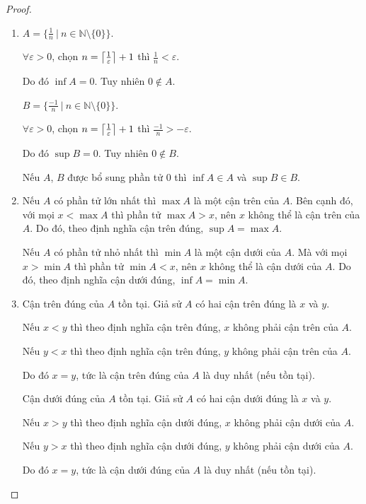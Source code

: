 \documentclass[class=analysis,crop=false]{standalone}
\begin{document}
\begin{proof}
    \begin{enumerate}[label = (\roman*)]
        \item $A = \{ \frac{1}{n}\ |\ n\in\mathbb{N}\setminus\{ 0 \} \}$.
            \par $\forall\varepsilon > 0$, chọn $n = \left\lceil{\frac{1}{\varepsilon}}\right\rceil + 1$ thì $\frac{1}{n} < \varepsilon$.
            \par Do đó $\inf A = 0$. Tuy nhiên $0\not\in A$.
            \par $B = \{ \frac{-1}{n}\ |\ n\in\mathbb{N}\setminus\{ 0 \} \}$.
            \par $\forall\varepsilon > 0$, chọn $n = \left\lceil{\frac{1}{\varepsilon}}\right\rceil + 1$ thì $\frac{-1}{n} > -\varepsilon$.
            \par Do đó $\sup B = 0$. Tuy nhiên $0\not\in B$.
            \par Nếu $A$, $B$ được bổ sung phần tử $0$ thì $\inf A\in A$ và $\sup B\in B$.
        \item Nếu $A$ có phần tử lớn nhất thì $\max A$ là một cận trên của $A$. Bên cạnh đó, với mọi $x < \max A$ thì phần tử $\max A > x$, nên $x$ không thể là cận trên của $A$. Do đó, theo định nghĩa cận trên đúng, $\sup A = \max A$.
            \par Nếu $A$ có phần tử nhỏ nhất thì $\min A$ là một cận dưới của $A$. Mà với mọi $x > \min A$ thì phần tử $\min A < x$, nên $x$ không thể là cận dưới của $A$. Do đó, theo định nghĩa cận dưới đúng, $\inf A = \min A$.
        \item Cận trên đúng của $A$ tồn tại. Giả sử $A$ có hai cận trên đúng là $x$ và $y$.
            \par Nếu $x < y$ thì theo định nghĩa cận trên đúng, $x$ không phải cận trên của $A$.
            \par Nếu $y < x$ thì theo định nghĩa cận trên đúng, $y$ không phải cận trên của $A$.
            \par Do đó $x = y$, tức là cận trên đúng của $A$ là duy nhất (nếu tồn tại).
            \bigskip
            \par Cận dưới đúng của $A$ tồn tại. Giả sử $A$ có hai cận dưới đúng là $x$ và $y$.
            \par Nếu $x > y$ thì theo định nghĩa cận dưới đúng, $x$ không phải cận dưới của $A$.
            \par Nếu $y > x$ thì theo định nghĩa cận dưới đúng, $y$ không phải cận dưới của $A$.
            \par Do đó $x = y$, tức là cận dưới đúng của $A$ là duy nhất (nếu tồn tại).
     \end{enumerate}
\end{proof}
\end{document}
